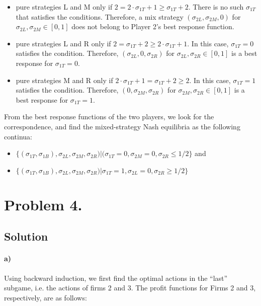 \documentclass[10pt,a4paper]{article}
\begin{document}
\begin{itemize}
\item pure strategies L and M only if $2 = 2 \cdot \sigma_{1T} + 1 \geq \sigma_{1T} + 2$. There is no such $\sigma_{1T}$ that satisfies the conditions. Therefore, a mix strategy $(\sigma_{2L}, \sigma_{2M}, 0)$ for $\sigma_{2L}, \sigma_{2M} \in {[0,1]}$ does not belong to Player 2's best response function.
\item pure strategies L and R only if $2 = \sigma_{1T} + 2 \geq 2 \cdot \sigma_{1T} + 1$. In this case, $\sigma_{1T} = 0$ satisfies the condition. Therefore,  $(\sigma_{2L}, 0, \sigma_{2R})$ for $\sigma_{2L}, \sigma_{2R} \in {[0,1]}$ is a best response for $\sigma_{1T} = 0$.
\item pure strategies M and R only if $2 \cdot \sigma_{1T} + 1 = \sigma_{1T} + 2 \geq 2.$ In this case, $\sigma_{1T} = 1$ satisfies the condition. Therefore,  $(0, \sigma_{2M}, \sigma_{2R})$ for $\sigma_{2M}, \sigma_{2R} \in {[0,1]}$ is a best response for $\sigma_{1T} = 1$.
\end{itemize}

From the best response functions of the two players, we look for the correspondence, and find the mixed-strategy Nash equilibria as the following continua:

\begin{itemize}
\item $\{(\sigma_{1T}, \sigma_{1B}), \sigma_{2L}, \sigma_{2M}, \sigma_{2R}) | (\sigma_{1T} = 0, \sigma_{2M} = 0, \sigma_{2R} \leq 1/2\}$ and
\item $\{(\sigma_{1T}, \sigma_{1B}), \sigma_{2L}, \sigma_{2M}, \sigma_{2R}) | \sigma_{1T} = 1, \sigma_{2L}=0, \sigma_{2R} \geq 1/2\}$
\end{itemize}

\section*{Problem 4.}

\subsection*{Solution} 
\paragraph*{a)}
Using backward induction, we first find the optimal actions in the ``last'' subgame, i.e. the actions of firms 2 and 3. The profit functions for Firms 2 and 3, respectively, are as follows:
\end{document}
